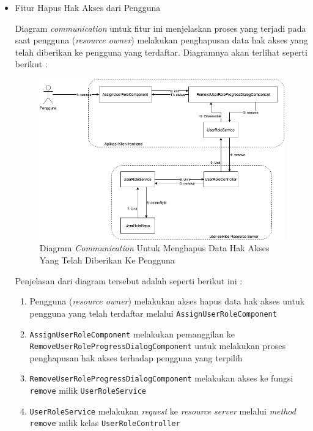 \documentclass[pdftex,12pt, oneside]{article}
\begin{document}
\begin{itemize}
	\item Fitur Hapus Hak Akses dari Pengguna
	
	Diagram \textit{communication} untuk fitur ini menjelaskan proses yang terjadi pada saat pengguna (\textit{resource owner}) melakukan penghapusan data hak akses yang telah diberikan ke pengguna yang terdaftar. Diagramnya akan terlihat seperti berikut :
	
	\begin{figure}
		\centering
		\includegraphics[width=1\textwidth]{./resources/comm-dia-remove-user-role}
		\caption{Diagram \textit{Communication} Untuk Menghapus Data Hak Akses Yang Telah Diberikan Ke Pengguna}
		\label{fig:comm-dia-remove-user-role}
	\end{figure}
	
	Penjelasan dari diagram tersebut adalah seperti berikut ini :
	
	\begin{enumerate}
		\item Pengguna (\textit{resource owner}) melakukan akses hapus data hak akses untuk pengguna yang telah terdaftar melalui \texttt{AssignUserRoleComponent}
		
		\item \texttt{AssignUserRoleComponent} melakukan pemanggilan ke \texttt{RemoveUserRoleProgressDialogComponent} untuk melakukan proses penghapusan hak akses terhadap pengguna yang terpilih
		
		\item \texttt{RemoveUserRoleProgressDialogComponent} melakukan akses ke fungsi \texttt{remove} milik \texttt{UserRoleService}
		
		\item \texttt{UserRoleService} melakukan \textit{request} ke \textit{resource server} melalui \textit{method} \texttt{remove} milik kelas \texttt{UserRoleController}
		

\end{enumerate}
\end{itemize}
\end{document}
